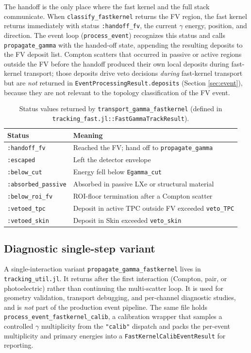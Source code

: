 \documentclass[11pt]{article}
\begin{document}
The handoff is the only place where the fast kernel and the full stack
communicate. When \texttt{classify\_fastkernel} returns the FV region, the
fast kernel returns immediately with status \texttt{:handoff\_fv}, the
current $\gamma$ energy, position, and direction. The event loop
(\texttt{process\_event}) recognizes this status and calls
\texttt{propagate\_gamma} with the handed-off state, appending the resulting
deposits to the FV deposit list. Compton scatters that occurred in passive
or active regions outside the FV before the handoff produced their own local
deposits during fast-kernel transport; those deposits drive veto decisions
\emph{during} fast-kernel transport but are \emph{not} returned in
\texttt{EventProcessingResult.deposits} (Section \ref{sec:event}), because
they are not relevant to the topology classification of the FV event.

\begin{table}[h]
\centering
\begin{tabular}{ll}
\toprule
Status & Meaning \\
\midrule
\texttt{:handoff\_fv}      & Reached the FV; hand off to \texttt{propagate\_gamma} \\
\texttt{:escaped}          & Left the detector envelope \\
\texttt{:below\_cut}       & Energy fell below \texttt{Egamma\_cut} \\
\texttt{:absorbed\_passive}& Absorbed in passive LXe or structural material \\
\texttt{:below\_roi\_fv}   & ROI-floor termination after a Compton scatter \\
\texttt{:vetoed\_tpc}      & Deposit in active TPC outside FV exceeded \texttt{veto\_TPC} \\
\texttt{:vetoed\_skin}     & Deposit in Skin exceeded \texttt{veto\_skin} \\
\bottomrule
\end{tabular}
\caption{Status values returned by
\texttt{transport\_gamma\_fastkernel} (defined in
\texttt{tracking\_fast.jl::FastGammaTrackResult}).}
\label{tab:fastkernel-status}
\end{table}

\subsection{Diagnostic single-step variant}
\label{sec:fastkernel-diagnostic}

A single-interaction variant \texttt{propagate\_gamma\_fastkernel} lives in
\texttt{tracking\_util.jl}. It returns after the first interaction (Compton,
pair, or photoelectric) rather than continuing the multi-scatter loop. It is
used for geometry validation, transport debugging, and per-channel
diagnostic studies, and is \emph{not} part of the production event pipeline.
The same file holds \texttt{process\_event\_fastkernel\_calib}, a
calibration wrapper that samples a controlled $\gamma$ multiplicity from the
\texttt{"calib"} dispatch and packs the per-event multiplicity and primary
energies into a \texttt{FastKernelCalibEventResult} for reporting.
\end{document}
